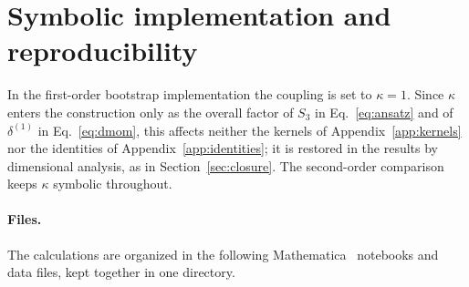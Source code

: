 \documentclass[prd,aps,preprint,nofootinbib,amsmath,amssymb,eqsecnum]{revtex4-2}
\begin{document}
\section{Symbolic implementation and reproducibility}
\label{app:implementation}

In the first-order bootstrap implementation the coupling is set to $\kappa=1$. Since
$\kappa$ enters the construction only as the overall factor of $S_3$ in Eq.~\eqref{eq:ansatz}
and of $\delta^{(1)}$ in Eq.~\eqref{eq:dmom}, this affects neither the kernels of
Appendix~\ref{app:kernels} nor the identities of Appendix~\ref{app:identities}; it is restored
in the results by dimensional analysis, as in Section~\ref{sec:closure}. The second-order
comparison keeps $\kappa$ symbolic throughout.

\paragraph{Files.} The calculations are organized in the following Mathematica~\cite{Mathematica}
notebooks and data files, kept together in one directory.
\end{document}
